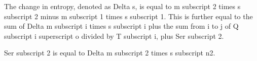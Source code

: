The change in entropy, denoted as Delta s, is equal to m subscript 2 times s subscript 2 minus m subscript 1 times s subscript 1. This is further equal to the sum of Delta m subscript i times s subscript i plus the sum from i to j of Q subscript i superscript o divided by T subscript i, plus Ser subscript 2.

Ser subscript 2 is equal to Delta m subscript 2 times s subscript n2.